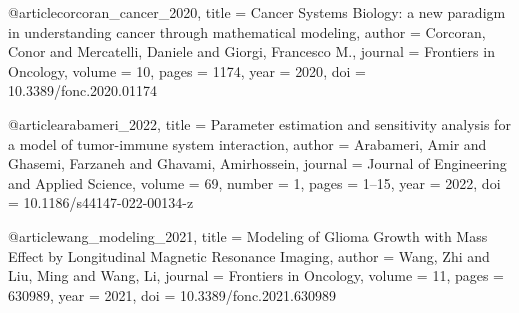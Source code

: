 @article{corcoran_cancer_2020,
  title   = {Cancer Systems Biology: a new paradigm in understanding cancer through mathematical modeling},
  author  = {Corcoran, Conor and Mercatelli, Daniele and Giorgi, Francesco M.},
  journal = {Frontiers in Oncology},
  volume  = {10},
  pages   = {1174},
  year    = {2020},
  doi     = {10.3389/fonc.2020.01174}
}

@article{arabameri_2022,
  title   = {Parameter estimation and sensitivity analysis for a model of tumor-immune system interaction},
  author  = {Arabameri, Amir and Ghasemi, Farzaneh and Ghavami, Amirhossein},
  journal = {Journal of Engineering and Applied Science},
  volume  = {69},
  number  = {1},
  pages   = {1--15},
  year    = {2022},
  doi     = {10.1186/s44147-022-00134-z}
}

@article{wang_modeling_2021,
  title   = {Modeling of Glioma Growth with Mass Effect by Longitudinal Magnetic Resonance Imaging},
  author  = {Wang, Zhi and Liu, Ming and Wang, Li},
  journal = {Frontiers in Oncology},
  volume  = {11},
  pages   = {630989},
  year    = {2021},
  doi     = {10.3389/fonc.2021.630989}
}
